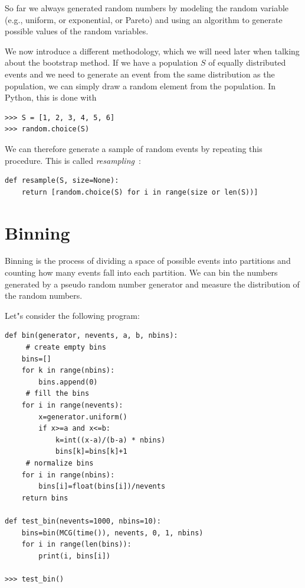 \documentclass[justified, sixbynine]{tufte-book}
\def\ft{\small\tt}
\theoremstyle{plain}%
\newtheorem * {corollary}{Corollary}
\theoremstyle{definition}
\theoremstyle{remark}
\newtheorem * {remark}{Remark}
\newtheorem * {note}{Note}
\begin{document}
\begin{fullwidth}
So far we always generated random numbers by modeling the random variable (e.g., uniform, or exponential, or Pareto) and using an algorithm to generate possible values of the random variables.

We now introduce a different methodology, which we will need later when talking about the bootstrap method.
If we have a population $S$ of equally distributed events and we need to generate an event from the same distribution as the population, we can simply draw a random element from the population. In Python, this is done with

\begin{lstlisting}
>>> S = [1, 2, 3, 4, 5, 6]
>>> random.choice(S)
\end{lstlisting}

We can therefore generate a sample of random events by repeating this procedure. This is called {\it resampling}~\cite{resampling}:

\begin{lstlisting}[caption={in file: {\ft nlib.py}}]
def resample(S, size=None):
    return [random.choice(S) for i in range(size or len(S))]
\end{lstlisting}

\goodbreak\section{Binning}

Binning is the process of dividing a space of possible events into
partitions and counting how many events fall into each partition. We can bin
the numbers generated by a pseudo random number generator and measure the
distribution of the random numbers.

Let"s consider the following program:
\begin{lstlisting}
def bin(generator, nevents, a, b, nbins):
     # create empty bins
    bins=[]
    for k in range(nbins):
        bins.append(0)
     # fill the bins
    for i in range(nevents):
        x=generator.uniform()
        if x>=a and x<=b:
            k=int((x-a)/(b-a) * nbins)
            bins[k]=bins[k]+1
     # normalize bins
    for i in range(nbins):
        bins[i]=float(bins[i])/nevents
    return bins

def test_bin(nevents=1000, nbins=10):
    bins=bin(MCG(time()), nevents, 0, 1, nbins)
    for i in range(len(bins)):
        print(i, bins[i])

>>> test_bin()
\end{lstlisting}


\end{fullwidth}
\end{document}
